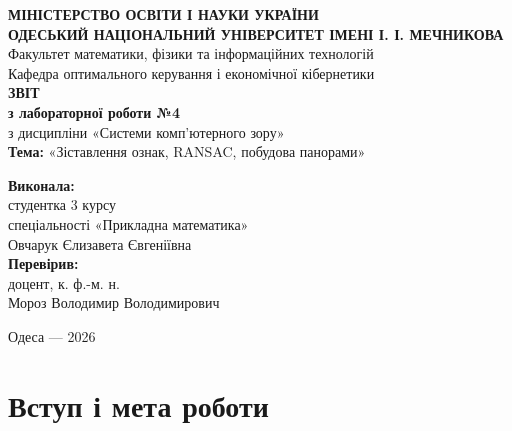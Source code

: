 \documentclass[12pt, a4paper]{article}
\begin{document}
	
	\begin{titlepage}
		\centering
		{\fontsize{14pt}{16pt}\selectfont \textbf{МІНІСТЕРСТВО ОСВІТИ І НАУКИ УКРАЇНИ}}\\[0.3em]
		{\fontsize{14pt}{16pt}\selectfont \textbf{ОДЕСЬКИЙ НАЦІОНАЛЬНИЙ УНІВЕРСИТЕТ ІМЕНІ І. І. МЕЧНИКОВА}}\\[0.3em]
		{\fontsize{14pt}{16pt}\selectfont Факультет математики, фізики та інформаційних технологій}\\[0.3em]
		{\fontsize{14pt}{16pt}\selectfont Кафедра оптимального керування і економічної кібернетики}\\[5em]
		
		{\fontsize{20pt}{24pt}\selectfont \textbf{ЗВІТ}}\\[1.2em]
		{\fontsize{16pt}{20pt}\selectfont \textbf{з лабораторної роботи №4}}\\[0.6em]
		{\fontsize{14pt}{18pt}\selectfont з дисципліни «Системи комп'ютерного зору»}\\[1.2em]
		{\fontsize{14pt}{18pt}\selectfont \textbf{Тема:} «Зіставлення ознак, RANSAC, побудова панорами»}\\[6em]
		
		\begin{flushright}
			\fontsize{14pt}{18pt}\selectfont
			\textbf{Виконала:}\\[0.2em]
			студентка 3 курсу\\[0.2em]
			спеціальності «Прикладна математика»\\[0.2em]
			Овчарук Єлизавета Євгеніївна\\[2em]
			
			\textbf{Перевірив:}\\[0.2em]
			доцент, к. ф.-м. н.\\[0.2em]
			Мороз Володимир Володимирович
		\end{flushright}
		
		\vfill
		{\fontsize{14pt}{16pt}\selectfont Одеса --- 2026}
	\end{titlepage}
	
	\newpage
	
	\section*{Вступ і мета роботи}
	
\end{document}
